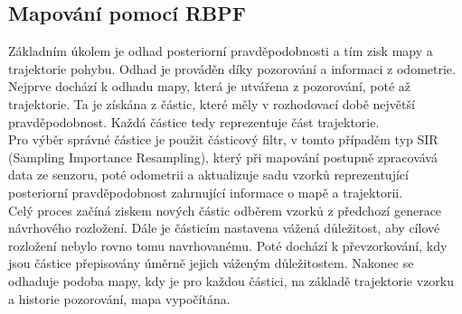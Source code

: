 \documentclass[12pt]{article}
\begin{document}
\subsection{Mapování pomocí RBPF}
Základním úkolem je odhad posteriorní pravděpodobnosti a tím zisk mapy a trajektorie pohybu. Odhad je prováděn díky pozorování a informaci z odometrie. Nejprve dochází k odhadu mapy, která je utvářena z pozorování, poté až trajektorie. Ta je získána z částic, které měly v rozhodovací době největší pravděpodobnost. Každá částice tedy reprezentuje část trajektorie.\\
\indent Pro výběr správné částice je použit částicový filtr, v tomto případěm typ SIR (Sampling Importance Resampling), který při mapování postupně zpracovává data ze senzoru, poté odometrii a aktualizuje sadu vzorků reprezentující posteriorní pravděpodobnost zahrnující informace o mapě a trajektorii. \\
\indent Celý proces začíná ziskem nových částic odběrem vzorků z předchozí generace návrhového rozložení. Dále je částicím nastavena vážená důležitost, aby cílové rozložení nebylo rovno tomu navrhovanému. Poté dochází k převzorkování, kdy jsou částice přepisovány úměrně jejich váženým důležitostem. Nakonec se odhaduje podoba mapy, kdy je pro každou částici, na základě trajektorie vzorku a historie pozorování, mapa vypočítána.
\end{document}

